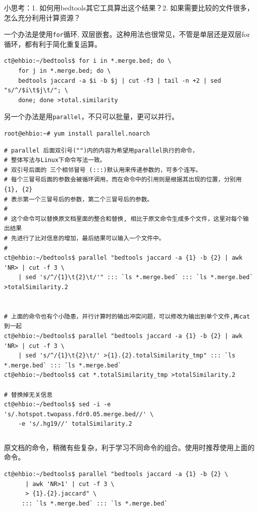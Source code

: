 \documentclass[]{article}
\numberwithin{figure}{section}
\numberwithin{table}{section}
\begin{document}
小思考：1. 如何用bedtools其它工具算出这个结果？2. 如果需要比较的文件很多，怎么充分利用计算资源？

一个办法是使用\texttt{for}循环, 双层嵌套。这种用法也很常见，不管是单层还是双层for循环，都有利于简化重复运算。

\begin{verbatim}
ct@ehbio:~/bedtools$ for i in *.merge.bed; do \
	for j in *.merge.bed; do \
	bedtools jaccard -a $i -b $j | cut -f3 | tail -n +2 | sed "s/^/$i\t$j\t/"; \
	done; done >total.similarity
\end{verbatim}

另一个办法是用\texttt{parallel}，不只可以批量，更可以并行。

\begin{verbatim}
root@ehbio:~# yum install parallel.noarch
\end{verbatim}

\begin{verbatim}
# parallel 后面双引号("")内的内容为希望用parallel执行的命令，
# 整体写法与Linux下命令写法一致。
# 双引号后面的 三个相邻冒号 (:::)默认用来传递参数的，可多个连写。
# 每个三冒号后面的参数会被循环调用，而在命令中的引用则是根据其出现的位置，分别用{1}, {2}
# 表示第一个三冒号后的参数，第二个三冒号后的参数。
#
# 这个命令可以替换原文档里面的整合和替换, 相比于原文命令生成多个文件，这里对每个输出结果
# 先进行了比对信息的增加，最后结果可以输入一个文件中。
#
ct@ehbio:~/bedtools$ parallel "bedtools jaccard -a {1} -b {2} | awk 'NR> | cut -f 3 \
	| sed 's/^/{1}\t{2}\t/'" ::: `ls *.merge.bed` ::: `ls *.merge.bed`  >totalSimilarity.2


# 上面的命令也有个小隐患，并行计算时的输出冲突问题，可以修改为输出到单个文件,再cat到一起
ct@ehbio:~/bedtools$ parallel "bedtools jaccard -a {1} -b {2} | awk 'NR> | cut -f 3 \
	| sed 's/^/{1}\t{2}\t/' >{1}.{2}.totalSimilarity_tmp" ::: `ls *.merge.bed` ::: `ls *.merge.bed` 
ct@ehbio:~/bedtools$ cat *.totalSimilarity_tmp >totalSimilarity.2

# 替换掉无关信息
ct@ehbio:~/bedtools$ sed -i -e 's/.hotspot.twopass.fdr0.05.merge.bed//' \
	-e 's/.hg19//' totalSimilarity.2  
\end{verbatim}

\begin{verbatim}
\end{verbatim}

原文档的命令，稍微有些复杂，利于学习不同命令的组合。使用时推荐使用上面的命令。

\begin{verbatim}
ct@ehbio:~/bedtools$ parallel "bedtools jaccard -a {1} -b {2} \
	  | awk 'NR>1' | cut -f 3 \
	  > {1}.{2}.jaccard" \
	 ::: `ls *.merge.bed` ::: `ls *.merge.bed`
\end{verbatim}
\end{document}
